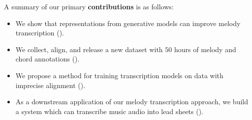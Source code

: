 A summary of our primary \textbf{contributions} is as follows:
\begin{itemize}
    \item We show that representations from generative models can improve melody transcription ().
    \item We collect, align, and release a new dataset with $50$ hours of melody and chord annotations ().
    \item We propose a method for training transcription models on data with imprecise alignment ().
    \item As a downstream application of our melody transcription approach, we build a system which can transcribe music audio into lead sheets ().
\end{itemize}